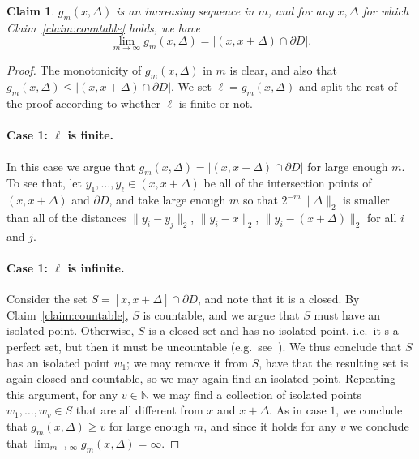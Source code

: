 \documentclass[10pt,a4paper]{article}
\newtheorem{claim}[thm]{Claim}
\newcommand\card[1]{\left| {#1} \right|}
\newcommand\norm[1]{\| #1 \|}
\renewcommand\geq{\geqslant}
\renewcommand\leq{\leqslant}
\newcommand{\De}{\Delta}
\begin{document}
    \begin{claim}\label{claim:converge}
      $g_{m}(x,\De)$ is an increasing sequence in $m$, and for any $x,\De$ for which Claim~\ref{claim:countable} holds, we have
      \[
      \lim_{m\rightarrow \infty} g_{m}(x,\De) = \card{(x,x+\De)\cap \partial D}.
      \]
    \end{claim}
    \begin{proof}
      The monotonicity of $g_m(x,\De)$ in $m$ is clear, and also that
      $g_{m}(x,\De)\leq \card{(x,x+\De)\cap \partial D}$. We set
      $\ell = g_{m}(x,\De)$ and split the rest of the proof according to
      whether $\ell$ is finite or not.

      \paragraph{Case 1: $\ell$ is finite.}
      In this case we argue that $g_{m}(x,\De) = \card{(x,x+\De)\cap \partial D}$
      for large enough $m$.  To see that, let $y_1,\ldots,y_\ell\in (x,x+\De)$ be all of the intersection
      points of $(x,x+\De)$ and $\partial D$, and take large enough $m$
      so that $2^{-m}\norm{\De}_2$ is smaller than all of the distances $\norm{y_i-y_j}_2$,
      $\norm{y_i-x}_2$, $\norm{y_i - (x + \De)}_2$ for all $i$ and $j$.

      \paragraph{Case 1: $\ell$ is infinite.}
      Consider the set $S = [x,x+\De]\cap \partial D$, and note that it is a closed.
      By Claim~\ref{claim:countable}, $S$ is countable, and we argue that $S$ must have an
      isolated point. Otherwise, $S$ is a closed set and has no isolated point, i.e.\
      it s a perfect set, but then it must be uncountable (e.g.\ see~\cite{perfect}).
      We thus conclude that $S$ has an isolated point $w_1$; we may remove it from
      $S$, have that the resulting set is again closed and countable, so we may again find
      an isolated point. Repeating this argument, for any $v\in\mathbb{N}$ we may find
      a collection of isolated points $w_1,\ldots,w_v\in S$ that are all different from
      $x$ and $x+\De$. As in case $1$, we conclude that $g_m(x,\De) \geq v$
      for large enough $m$, and since it holds for any $v$ we conclude that $\lim_{m\rightarrow \infty} g_m(x,\De) = \infty$.
    \end{proof}
\end{document}
